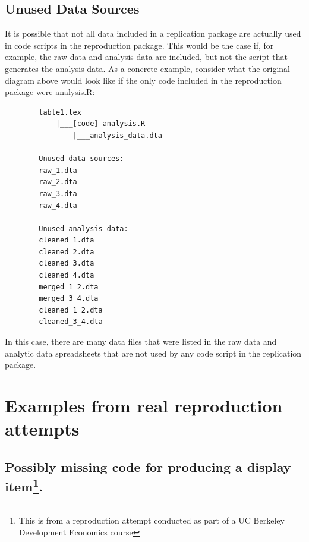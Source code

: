 \documentclass[
]{book}
\begin{document}
\hypertarget{unused-data-sources}{%
\subsection{Unused Data Sources}\label{unused-data-sources}}

It is possible that not all data included in a replication package are actually used in code scripts in the reproduction package. This would be the case if, for example, the raw data and analysis data are included, but not the script that generates the analysis data. As a concrete example, consider what the original diagram above would look like if the only code included in the reproduction package were analysis.R:

\begin{verbatim}
        table1.tex
            |___[code] analysis.R
                |___analysis_data.dta

        Unused data sources:
        raw_1.dta
        raw_2.dta
        raw_3.dta
        raw_4.dta

        Unused analysis data:
        cleaned_1.dta
        cleaned_2.dta
        cleaned_3.dta
        cleaned_4.dta
        merged_1_2.dta
        merged_3_4.dta
        cleaned_1_2.dta
        cleaned_3_4.dta
\end{verbatim}

In this case, there are many data files that were listed in the raw data and analytic data spreadsheets that are not used by any code script in the replication package.

\hypertarget{examples-from-real-reproduction-attempts}{%
\section{Examples from real reproduction attempts}\label{examples-from-real-reproduction-attempts}}

\hypertarget{possibly-missing-code-for-producing-a-display-item.}{%
\subsection[Possibly missing code for producing a display item.]{\texorpdfstring{Possibly missing code for producing a display item\footnote{This is from a reproduction attempt conducted as part of a UC Berkeley Development Economics course}.}{Possibly missing code for producing a display item.}}\label{possibly-missing-code-for-producing-a-display-item.}}
\end{document}
